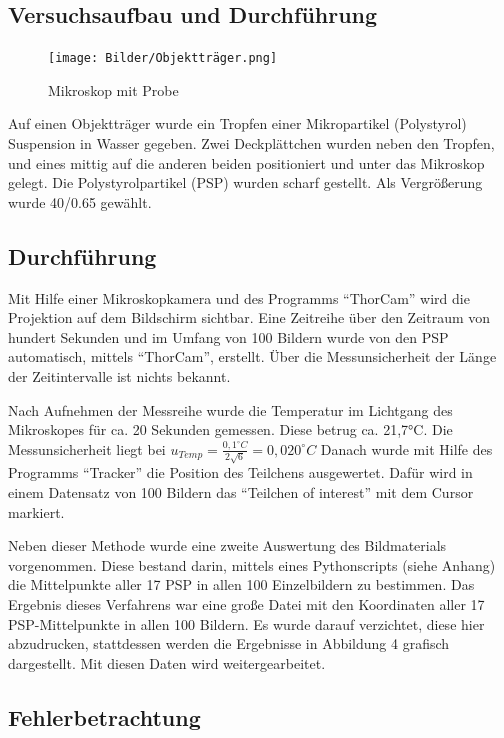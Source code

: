 \documentclass[
  9pt,
]{article}
\begin{document}
\hypertarget{versuchsaufbau-und-durchfuxfchrung}{%
\subsection{Versuchsaufbau und
Durchführung}\label{versuchsaufbau-und-durchfuxfchrung}}

\begin{figure}
\centering
\texttt{[image: Bilder/Objektträger.png]}
\caption{Mikroskop mit Probe}
\end{figure}

Auf einen Objektträger wurde ein Tropfen einer Mikropartikel
(Polystyrol) Suspension in Wasser gegeben. Zwei Deckplättchen wurden
neben den Tropfen, und eines mittig auf die anderen beiden positioniert
und unter das Mikroskop gelegt. Die Polystyrolpartikel (PSP) wurden
scharf gestellt. Als Vergrößerung wurde 40/0.65 gewählt.

\hypertarget{durchfuxfchrung}{%
\subsection{Durchführung}\label{durchfuxfchrung}}

Mit Hilfe einer Mikroskopkamera und des Programms ``ThorCam'' wird die
Projektion auf dem Bildschirm sichtbar. Eine Zeitreihe über den Zeitraum
von hundert Sekunden und im Umfang von 100 Bildern wurde von den PSP
automatisch, mittels ``ThorCam'', erstellt. Über die Messunsicherheit
der Länge der Zeitintervalle ist nichts bekannt.

Nach Aufnehmen der Messreihe wurde die Temperatur im Lichtgang des
Mikroskopes für ca. 20 Sekunden gemessen. Diese betrug ca. 21,7°C. Die
Messunsicherheit liegt bei
\(u_{Temp}=\frac{0,1^{\circ}C}{2\sqrt{6}}= 0,020^{\circ}C\) Danach wurde
mit Hilfe des Programms ``Tracker'' die Position des Teilchens
ausgewertet. Dafür wird in einem Datensatz von 100 Bildern das
``Teilchen of interest'' mit dem Cursor markiert.

Neben dieser Methode wurde eine zweite Auswertung des Bildmaterials
vorgenommen. Diese bestand darin, mittels eines Pythonscripts (siehe
Anhang) die Mittelpunkte aller 17 PSP in allen 100 Einzelbildern zu
bestimmen. Das Ergebnis dieses Verfahrens war eine große Datei mit den
Koordinaten aller 17 PSP-Mittelpunkte in allen 100 Bildern. Es wurde
darauf verzichtet, diese hier abzudrucken, stattdessen werden die
Ergebnisse in Abbildung 4 grafisch dargestellt. Mit diesen Daten wird
weitergearbeitet.

\hypertarget{fehlerbetrachtung}{%
\subsection{Fehlerbetrachtung}\label{fehlerbetrachtung}}
\end{document}
